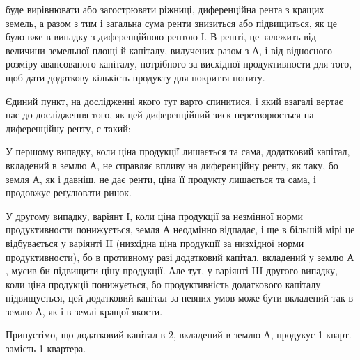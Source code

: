 \parcont{}  %
буде вирівнювати або загострювати ріжниці, диференційна рента з кращих земель,
а разом з тим і загальна сума ренти знизиться або підвищиться, як це було
вже в випадку з диференційною рентою І. В решті, це залежить від величини земельної
площі й капіталу, вилучених разом з $А$, і від відносного розміру авансованого
капіталу, потрібного за висхідної продуктивности для того, щоб дати
додаткову кількість продукту для покриття попиту.

Єдиний пункт, на дослідженні якого тут варто спинитися, і який взагалі
вертає нас до дослідження того, як цей диференційний зиск перетворюється
на диференційну ренту, є такий:

У першому випадку, коли ціна продукції лишається та сама, додатковий
капітал, вкладений в землю $А$, не справляє впливу на диференційну ренту, як
таку, бо земля $А$, як і давніш, не дає ренти, ціна її продукту лишається та
сама, і продовжує реґулювати ринок.

У другому випадку, варіянт І, коли ціна продукції за незмінної норми продуктивности
понижується, земля $А$ неодмінно відпадає, і ще в більшій мірі це
відбувається у варіянті II (низхідна ціна продукції за низхідної норми продуктивности),
бо в противному разі додатковий капітал, вкладений у землю $А$,
мусив би підвищити ціну продукції. Але тут, у варіянті III другого випадку,
коли ціна продукції понижується, бо продуктивність додаткового капіталу підвищується,
цей додатковий капітал за певних умов може бути вкладений так
в землю $А$, як і в землі кращої якости.

Припустімо, що додатковий капітал в 2, вкладений в землю
$А$, продукує 1 кварт. замість 1 квартера.

